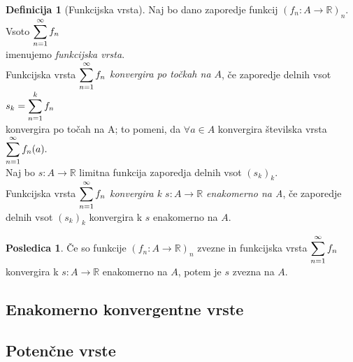 \documentclass[11pt]{article}
\theoremstyle{definition}
\newtheorem{definicija}{Definicija}[section]
\theoremstyle{definition}
\theoremstyle{definition}
\theoremstyle{theorem}
\newtheorem*{posledica}{Posledica}
\begin{document}
\begin{definicija}[Funkcijska vrsta]

Naj bo dano zaporedje funkcij $(f_n: A \rightarrow \mathbb{R})_n$. Vsoto $\mathlarger{\sum_{n=1}^{\infty} f_n}$ \\ imenujemo \textit{funkcijska vrsta}. \\

Funkcijska vrsta $\mathlarger{\sum_{n=1}^{\infty} f_n}$ \textit{konvergira po točkah na $A$}, če zaporedje delnih vsot $s_k = \mathlarger{\sum_{n=1}^{k} f_n}$ \\ konvergira po točah na A; to pomeni, da $\forall a \in A$ konvergira številska vrsta $\mathlarger{\sum_{n=1}^{\infty} f_n(a)}.$ \\

Naj bo $s: A \rightarrow \mathbb{R}$ limitna funkcija zaporedja delnih vsot $(s_k)_k$. \\
Funkcijska vrsta $\mathlarger{\sum_{n=1}^{\infty}f_n}$ \textit{konvergira k $s: A \rightarrow \mathbb{R}$ enakomerno na A}, če zaporedje delnih vsot $(s_k)_k$ konvergira k $s$ enakomerno na $A$.
 

\end{definicija}
\vspace{0.5cm}

\begin{posledica}

Če so funkcije $(f_n: A \rightarrow \mathbb{R})_n$ zvezne in funkcijska vrsta $\mathlarger{\sum_{n=1}^{\infty} f_n}$ konvergira k $s: A \rightarrow \mathbb{R}$ enakomerno na $A$, potem je $s$ zvezna na $A$.

\end{posledica}
\vspace{0.5cm}


\subsection{Enakomerno konvergentne vrste}
\vspace{0.5cm}


\subsection{Potenčne vrste}
\vspace{0.5cm}
\end{document}
